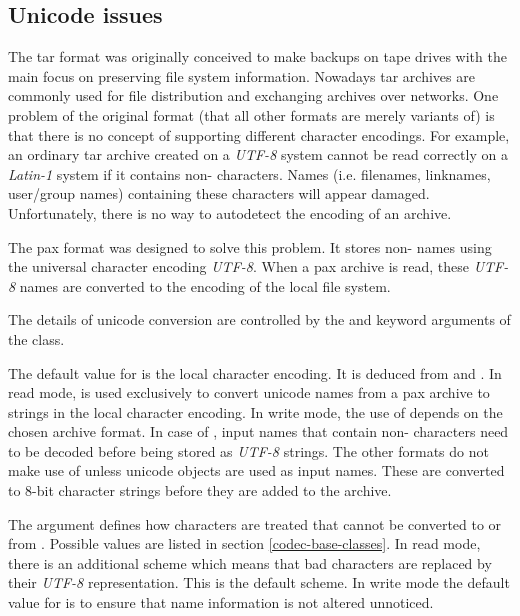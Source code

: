 
\subsection{Unicode issues \label{tar-unicode}}

The tar format was originally conceived to make backups on tape drives with the
main focus on preserving file system information. Nowadays tar archives are
commonly used for file distribution and exchanging archives over networks. One
problem of the original format (that all other formats are merely variants of)
is that there is no concept of supporting different character encodings.
For example, an ordinary tar archive created on a \emph{UTF-8} system cannot be
read correctly on a \emph{Latin-1} system if it contains non-\ASCII{}
characters. Names (i.e. filenames, linknames, user/group names) containing
these characters will appear damaged.  Unfortunately, there is no way to
autodetect the encoding of an archive.

The pax format was designed to solve this problem. It stores non-\ASCII{} names
using the universal character encoding \emph{UTF-8}. When a pax archive is
read, these \emph{UTF-8} names are converted to the encoding of the local
file system.

The details of unicode conversion are controlled by the  and
 keyword arguments of the  class.

The default value for  is the local character encoding. It is
deduced from  and
. In read mode,  is used
exclusively to convert unicode names from a pax archive to strings in the local
character encoding. In write mode, the use of  depends on the
chosen archive format. In case of , input names that
contain non-\ASCII{} characters need to be decoded before being stored as
\emph{UTF-8} strings. The other formats do not make use of 
unless unicode objects are used as input names. These are converted to
8-bit character strings before they are added to the archive.

The  argument defines how characters are treated that cannot be
converted to or from . Possible values are listed in section
\ref{codec-base-classes}. In read mode, there is an additional scheme
 which means that bad characters are replaced by their
\emph{UTF-8} representation. This is the default scheme. In write mode the
default value for  is  to ensure that name
information is not altered unnoticed.

